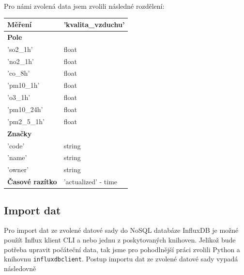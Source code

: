 \documentclass[a4paper, 11pt]{article}
\begin{document}
    Pro námi zvolená data jsem zvolili následné rozdělení:
    
    \begin{table}[h!]
    \centering
    \begin{tabular}{|l|l|}
    \hline
    \textbf{Měření} & 'kvalita\_vzduchu' \\ \hline
    \textbf{Pole} &  \\ \hline
    'so2\_1h' & float \\ 
    'no2\_1h' & float \\ 
    'co\_8h' & float \\ 
    'pm10\_1h' & float \\ 
    'o3\_1h' & float \\ 
    'pm10\_24h' & float \\ 
    'pm2\_5\_1h' & float \\ \hline
    \textbf{Značky} &  \\ \hline
    'code' & string \\ 
    'name' & string \\ 
    'owner' & string \\ \hline
    \textbf{Časové razítko} & 'actualized' - time \\ \hline
    \end{tabular}
    \end{table}
    
    \subsection{Import dat}

         Pro import dat ze zvolené datové sady do NoSQL databáze InfluxDB je možné použít Influx klient CLI a nebo jednu z poskytovaných knihoven. Jelikož bude potřeba upravit počáteční data, tak jsme pro pohodlnější práci zvolili Python a knihovnu \texttt{influxdb\textunderscore client}. Postup importu dat ze zvolené datové sady vypadá následovně
\end{document}
